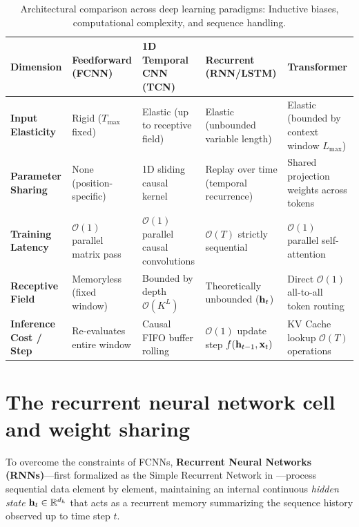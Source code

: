 \documentclass[../../main.tex]{subfiles}
\begin{document}
\begin{table}[htbp]
\centering
\small
\caption{Architectural comparison across deep learning paradigms: Inductive biases, computational complexity, and sequence handling.}
\label{tab:paradigm_comparison_matrix}
\begin{tabularx}{\textwidth}{l p{2.4cm} p{2.8cm} p{2.6cm} X}
\toprule
\textbf{Dimension} & \textbf{Feedforward (FCNN)} & \textbf{1D Temporal CNN (TCN)} & \textbf{Recurrent (RNN/LSTM)} & \textbf{Transformer} \\
\midrule
\textbf{Input Elasticity} & Rigid ($T_{\max}$ fixed) & Elastic (up to receptive field) & Elastic (unbounded variable length) & Elastic (bounded by context window $L_{\max}$) \\
\midrule
\textbf{Parameter Sharing} & None (position-specific) & 1D sliding causal kernel & Replay over time (temporal recurrence) & Shared projection weights across tokens \\
\midrule
\textbf{Training Latency} & $\mathcal{O}(1)$ parallel matrix pass & $\mathcal{O}(1)$ parallel causal convolutions & $\mathcal{O}(T)$ strictly sequential & $\mathcal{O}(1)$ parallel self-attention \\
\midrule
\textbf{Receptive Field} & Memoryless (fixed window) & Bounded by depth $\mathcal{O}(K^L)$ & Theoretically unbounded ($\mathbf{h}_t$) & Direct $\mathcal{O}(1)$ all-to-all token routing \\
\midrule
\textbf{Inference Cost / Step} & Re-evaluates entire window & Causal FIFO buffer rolling & $\mathcal{O}(1)$ update step $f(\mathbf{h}_{t-1}, \mathbf{x}_t)$ & KV Cache lookup $\mathcal{O}(T)$ operations \\
\bottomrule
\end{tabularx}
\end{table}

\clearpage
\section{The recurrent neural network cell and weight sharing}
\label{sec:rnn_cell}

To overcome the constraints of FCNNs, \textbf{Recurrent Neural Networks (RNNs)}---first formalized as the Simple Recurrent Network in \cite{elman1990}---process sequential data element by element, maintaining an internal continuous \emph{hidden state} $\mathbf{h}_t \in \mathbb{R}^{d_h}$ that acts as a recurrent memory summarizing the sequence history observed up to time step $t$.
\end{document}
